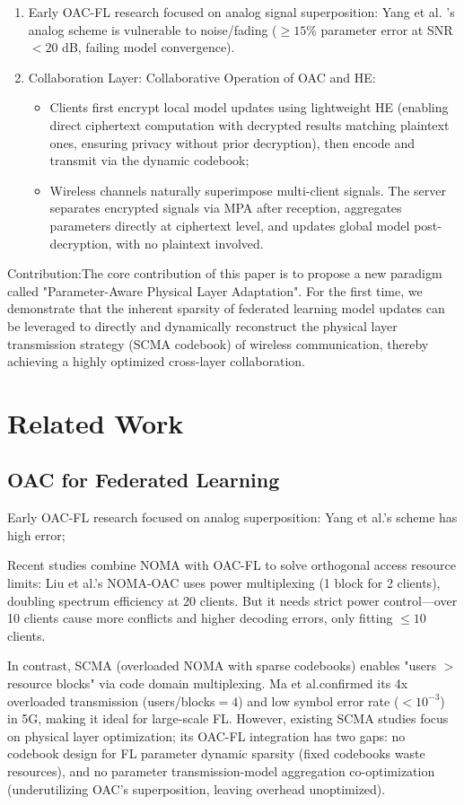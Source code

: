\documentclass[runningheads]{llncs}
\begin{document}
\begin{enumerate}
\item Early OAC-FL research focused on analog signal superposition: Yang\cite{yang2020federated} et al. 's analog scheme is vulnerable to noise/fading ($\geq15\%$ parameter error at SNR$<20$ dB, failing model convergence).
\item Collaboration Layer: Collaborative Operation of OAC and HE:
\begin{itemize}
    \item Clients first encrypt local model updates using lightweight HE (enabling direct ciphertext computation with decrypted results matching plaintext ones, ensuring privacy without prior decryption), then encode and transmit via the dynamic codebook;
    \item Wireless channels naturally superimpose multi-client signals. The server separates encrypted signals via MPA after reception, aggregates parameters directly at ciphertext level, and updates global model post-decryption, with no plaintext involved.
\end{itemize}
\end{enumerate}
Contribution:The core contribution of this paper is to propose a new paradigm called "Parameter-Aware Physical Layer Adaptation". For the first time, we demonstrate that the inherent sparsity of federated learning model updates can be leveraged to directly and dynamically reconstruct the physical layer transmission strategy (SCMA codebook) of wireless communication, thereby achieving a highly optimized cross-layer collaboration.

\section{Related Work}
\subsection{OAC for Federated Learning}
Early OAC-FL research focused on analog superposition: Yang\cite{yang2020federated} et al.’s scheme has high error;

Recent studies combine NOMA with OAC-FL to solve orthogonal access resource limits: Liu\cite{li2023multi} et al.'s NOMA-OAC uses power multiplexing (1 block for 2 clients), doubling spectrum efficiency at 20 clients. But it needs strict power control—over 10 clients cause more conflicts and higher decoding errors, only fitting $\leq$$10$ clients.

In contrast, SCMA (overloaded NOMA with sparse codebooks) enables "users $>$ resource blocks" via code domain multiplexing. Ma \cite{ma2018sparse}et al.confirmed its 4x overloaded transmission (users/blocks$=$$4$) and low symbol error rate ($<$$10^{-3}$) in 5G, making it ideal for large-scale FL. However, existing SCMA studies focus on physical layer optimization; its OAC-FL integration has two gaps: no codebook design for FL parameter dynamic sparsity (fixed codebooks waste resources), and no parameter transmission-model aggregation co-optimization (underutilizing OAC's superposition, leaving overhead unoptimized).
\end{document}

